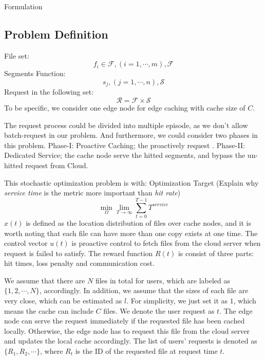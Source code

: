 \documentclass{article}
\begin{document}
\begin{section}{Formulation}
    \subsection{Problem Definition}
    File set:
    $$
    f_i\in\mathcal{F},(i=1,\cdots,m), \mathcal{F}
    $$
    Segments Function:
    $$
    s_j,(j=1,\cdots,n), \mathcal{S}
    $$
    Request in the following set:
    $$
    \mathcal{R}=\mathcal{F}\times\mathcal{S}
    $$
    To be specific, we consider one edge node for edge caching with cache size of $C$.

    The request process could be divided into multiple episode, as we don't allow batch-request in our problem.
    And furthermore, we could consider two phases in this problem.
    Phase-I: Proactive Caching; the proactively request .
    Phase-II: Dedicated Service; the cache node serve the hitted segments, and bypass the un-hitted request from Cloud.

    This stochastic optimization problem is with:
    Optimization Target (Explain why \emph{service time} is the metric more important than \emph{hit rate})
    $$
        \min_{\Omega}\lim_{T \to \infty} \sum_{t=0}^{T-1} T^{service}
    $$
    $x(t)$ is defined as the location distribution of files over cache nodes, and it is worth noting that each file can have more than one copy exists at one time. The control vector $u(t)$ is proactive control to fetch files from the cloud server when request is failed to satisfy. The reward function $R(t)$ is consist of three parts: hit times, loss penalty and communication cost.

    We assume that there are $N$ files in total for users, which are labeled as $\{1,2,\cdots,N\}$, accordingly. In addition, we assume that the sizes of each file are very close, which can be estimated as $l$. For simplicity, we just set it as $1$, which means the cache can include $C$ files. We denote the user request as $t$. The edge node can serve the request immediately if the requested file has been cached locally. Otherwise, the edge node has to request this file from the cloud server and updates the local cache accordingly. The list of users' requests is denoted as $\{R_1,R_2,\cdots\}$, where $R_t$ is the ID of the requested file at request time $t$.
\end{section}
\end{document}
